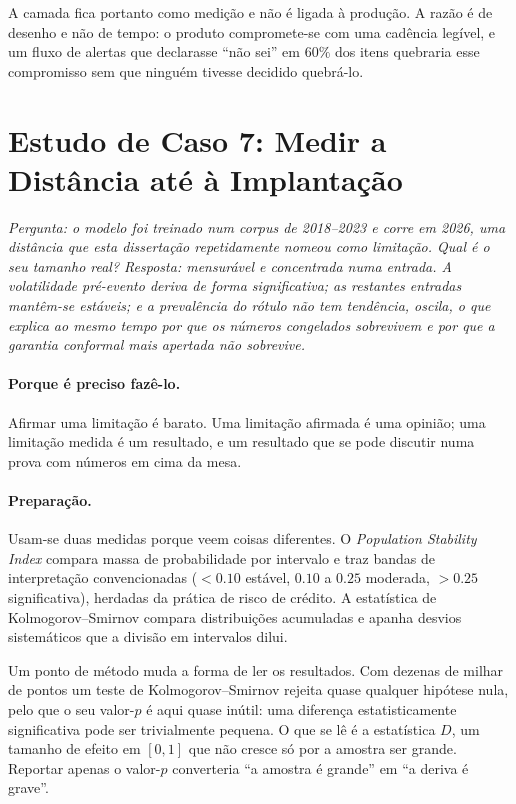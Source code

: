 A camada fica portanto como medição e não é ligada à produção. A razão é de desenho e não de tempo: o
produto compromete-se com uma cadência legível, e um fluxo de alertas que declarasse ``não sei'' em
$60\%$ dos itens quebraria esse compromisso sem que ninguém tivesse decidido quebrá-lo.

\section{Estudo de Caso 7: Medir a Distância até à Implantação}
\label{sec:cs_drift}

\emph{Pergunta: o modelo foi treinado num corpus de 2018--2023 e corre em 2026, uma distância que
esta dissertação repetidamente nomeou como limitação. Qual é o seu tamanho real? Resposta:
mensurável e concentrada numa entrada. A volatilidade pré-evento deriva de forma significativa; as
restantes entradas mantêm-se estáveis; e a prevalência do rótulo não tem tendência, oscila, o que
explica ao mesmo tempo por que os números congelados sobrevivem e por que a garantia conformal mais
apertada não sobrevive.}

\paragraph{Porque é preciso fazê-lo.} Afirmar uma limitação é barato. Uma limitação afirmada é uma
opinião; uma limitação medida é um resultado, e um resultado que se pode discutir numa prova com
números em cima da mesa.

\paragraph{Preparação.} Usam-se duas medidas porque veem coisas diferentes. O \emph{Population
Stability Index} compara massa de probabilidade por intervalo e traz bandas de interpretação
convencionadas ($<0.10$ estável, $0.10$ a $0.25$ moderada, $>0.25$ significativa), herdadas da
prática de risco de crédito. A estatística de Kolmogorov--Smirnov compara distribuições acumuladas e
apanha desvios sistemáticos que a divisão em intervalos dilui.

Um ponto de método muda a forma de ler os resultados. Com dezenas de milhar de pontos um teste de
Kolmogorov--Smirnov rejeita quase qualquer hipótese nula, pelo que o seu valor-$p$ é aqui quase
inútil: uma diferença estatisticamente significativa pode ser trivialmente pequena. O que se lê é a
estatística $D$, um tamanho de efeito em $[0,1]$ que não cresce só por a amostra ser grande. Reportar
apenas o valor-$p$ converteria ``a amostra é grande'' em ``a deriva é grave''.

